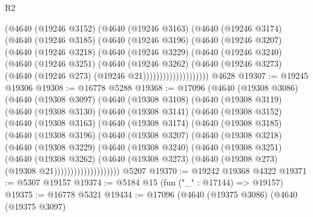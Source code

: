 \begin{lexlean}{R2}
\begin{coremodule}
                (@4640
                  (@19246 @3152)
                  (@4640
                    (@19246 @3163)
                    (@4640
                      (@19246 @3174)
                      (@4640
                        (@19246 @3185)
                        (@4640
                          (@19246 @3196)
                          (@4640
                            (@19246 @3207)
                            (@4640
                              (@19246 @3218)
                              (@4640
                                (@19246 @3229)
                                (@4640
                                  (@19246 @3240)
                                  (@4640
                                    (@19246 @3251)
                                    (@4640
                                      (@19246 @3262)
                                      (@4640
                                        (@19246 @3273)
                                        (@4640 (@19246 @273) (@19246 @21))))))))))))))))))))
    @4628
@19307 := @19245 @19306
@19308 := @16778 @5288
@19368 := @17096
    (@4640
      (@19308 @3086)
      (@4640
        (@19308 @3097)
        (@4640
          (@19308 @3108)
          (@4640
            (@19308 @3119)
            (@4640
              (@19308 @3130)
              (@4640
                (@19308 @3141)
                (@4640
                  (@19308 @3152)
                  (@4640
                    (@19308 @3163)
                    (@4640
                      (@19308 @3174)
                      (@4640
                        (@19308 @3185)
                        (@4640
                          (@19308 @3196)
                          (@4640
                            (@19308 @3207)
                            (@4640
                              (@19308 @3218)
                              (@4640
                                (@19308 @3229)
                                (@4640
                                  (@19308 @3240)
                                  (@4640
                                    (@19308 @3251)
                                    (@4640
                                      (@19308 @3262)
                                      (@4640
                                        (@19308 @3273)
                                        (@4640 (@19308 @273) (@19308 @21))))))))))))))))))))
    @5207
@19370 := @19242 @19368 @4322
@19371 := @5307 @19157
@19374 := @5184 @15 (fun ("_" : @17144) => @19157)
@19375 := @16778 @5321
@19434 := @17096
    (@4640
      (@19375 @3086)
      (@4640
        (@19375 @3097)

\end{coremodule}
\end{lexlean}

